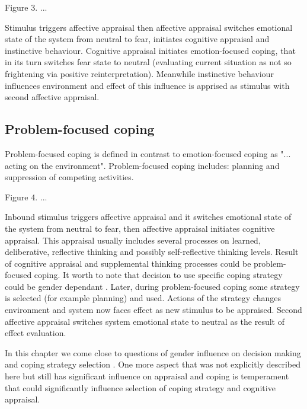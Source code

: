 \begin{center}
Figure 3. ...
\end{center}

Stimulus triggers affective appraisal then affective appraisal switches emotional state of the system from neutral to fear, initiates cognitive appraisal and instinctive behaviour. Cognitive appraisal initiates emotion-focused coping, that in its turn switches fear state to neutral (evaluating current situation as not so frightening via positive reinterpretation). Meanwhile instinctive behaviour influences environment and effect of this influence is apprised as stimulus with second affective appraisal.

\subsection{Problem-focused coping}

Problem-focused coping is defined in contrast to emotion-focused coping as "... acting on the environment". Problem-focused coping includes: planning and suppression of competing activities.

\begin{center}
Figure 4. ...
\end{center}

Inbound stimulus triggers affective appraisal and it switches emotional state of the system from neutral to fear, then affective appraisal initiates cognitive appraisal. This appraisal usually includes several processes on learned, deliberative, reflective thinking and possibly self-reflective thinking levels. Result of cognitive appraisal and supplemental thinking processes could be problem-focused coping. It worth to note that decision to use specific coping strategy could be gender dependant \cite{sex_differencies}. Later, during problem-focused coping some strategy is selected (for example planning) and used. Actions of the strategy changes environment and system now faces effect as new stimulus to be appraised. Second affective appraisal switches system emotional state to neutral as the result of effect evaluation.

In this chapter we come close to questions of gender influence on decision making and coping strategy selection \cite{sex_differencies}. One more aspect that was not explicitly described here but still has significant influence on appraisal and coping is temperament that could significantly influence selection of coping strategy and cognitive appraisal.

